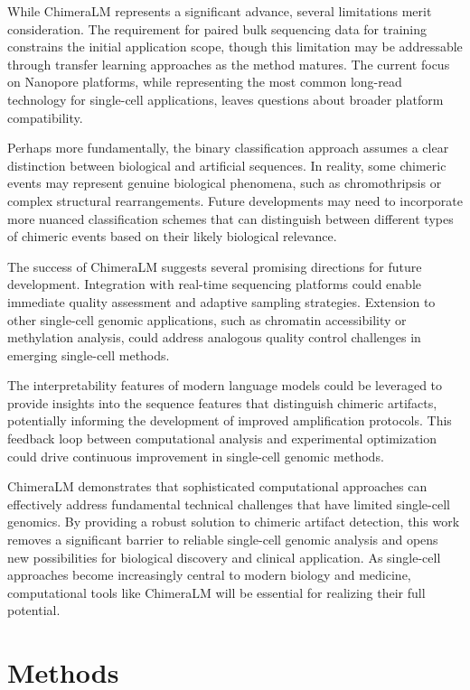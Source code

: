 \documentclass[pdflatex,sn-nature]{sn-jnl}%
\theoremstyle{thmstyleone}%
\theoremstyle{thmstyletwo}%
\theoremstyle{thmstylethree}%
\begin{document}
While ChimeraLM represents a significant advance, several limitations merit consideration.
The requirement for paired bulk sequencing data for training constrains the initial application scope, though this limitation may be addressable through transfer learning approaches as the method matures.
The current focus on Nanopore platforms, while representing the most common long-read technology for single-cell applications, leaves questions about broader platform compatibility.

Perhaps more fundamentally, the binary classification approach assumes a clear distinction between biological and artificial sequences.
In reality, some chimeric events may represent genuine biological phenomena, such as chromothripsis or complex structural rearrangements.
Future developments may need to incorporate more nuanced classification schemes that can distinguish between different types of chimeric events based on their likely biological relevance.

The success of ChimeraLM suggests several promising directions for future development.
Integration with real-time sequencing platforms could enable immediate quality assessment and adaptive sampling strategies.
Extension to other single-cell genomic applications, such as chromatin accessibility or methylation analysis, could address analogous quality control challenges in emerging single-cell methods.

The interpretability features of modern language models could be leveraged to provide insights into the sequence features that distinguish chimeric artifacts, potentially informing the development of improved amplification protocols.
This feedback loop between computational analysis and experimental optimization could drive continuous improvement in single-cell genomic methods.

ChimeraLM demonstrates that sophisticated computational approaches can effectively address fundamental technical challenges that have limited single-cell genomics.
By providing a robust solution to chimeric artifact detection, this work removes a significant barrier to reliable single-cell genomic analysis and opens new possibilities for biological discovery and clinical application.
As single-cell approaches become increasingly central to modern biology and medicine, computational tools like ChimeraLM will be essential for realizing their full potential.

\section*{Methods}\label{sec:methods}
\end{document}
